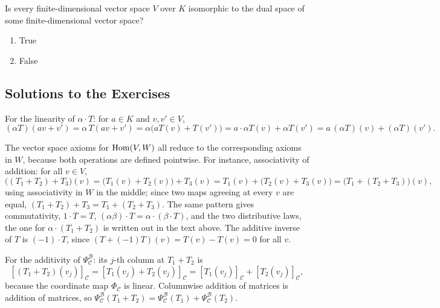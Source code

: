 \begin{exercise}
\label{exc:every_finite_dim_is_dual_sc}
Is every finite-dimensional vector space $V$ over $K$ isomorphic to the dual space of some finite-dimensional vector space?
\begin{enumerate}
    \item True
    \item False
\end{enumerate}
\end{exercise}

\subsection{Solutions to the Exercises}
\label{sec:solutions_hom_dual}

\begin{exercisesolution}
\label{sol:hom_axioms}
For the linearity of $\alpha \cdot T$: for $a \in K$ and $v, v' \in V$,
\[
(\alpha T)(a v + v') = \alpha \, T(av + v') = \alpha \big( a T(v) + T(v') \big) = a \cdot \alpha T(v) + \alpha T(v') = a \, (\alpha T)(v) + (\alpha T)(v').
\]

The vector space axioms for $\operatorname{Hom}(V,W)$ all reduce to the corresponding axioms in $W$, because both operations are defined pointwise. For instance, associativity of addition: for all $v \in V$,
\[
\big((T_1 + T_2) + T_3\big)(v) = \big(T_1(v) + T_2(v)\big) + T_3(v) = T_1(v) + \big(T_2(v) + T_3(v)\big) = \big(T_1 + (T_2 + T_3)\big)(v),
\]
using associativity in $W$ in the middle; since two maps agreeing at every $v$ are equal, $(T_1 + T_2) + T_3 = T_1 + (T_2 + T_3)$. The same pattern gives commutativity, $1 \cdot T = T$, $(\alpha\beta) \cdot T = \alpha \cdot (\beta \cdot T)$, and the two distributive laws, the one for $\alpha \cdot (T_1 + T_2)$ is written out in the text above. The additive inverse of $T$ is $(-1) \cdot T$, since $(T + (-1)T)(v) = T(v) - T(v) = 0$ for all $v$.

For the additivity of $\Psi_{\mathcal{C}}^{\mathcal{B}}$: its $j$-th column at $T_1 + T_2$ is
\[
[(T_1 + T_2)(v_j)]_{\mathcal{C}} = [T_1(v_j) + T_2(v_j)]_{\mathcal{C}} = [T_1(v_j)]_{\mathcal{C}} + [T_2(v_j)]_{\mathcal{C}},
\]
because the coordinate map $\Phi_{\mathcal{C}}$ is linear. Columnwise addition of matrices is addition of matrices, so $\Psi_{\mathcal{C}}^{\mathcal{B}}(T_1 + T_2) = \Psi_{\mathcal{C}}^{\mathcal{B}}(T_1) + \Psi_{\mathcal{C}}^{\mathcal{B}}(T_2)$.
\end{exercisesolution}

